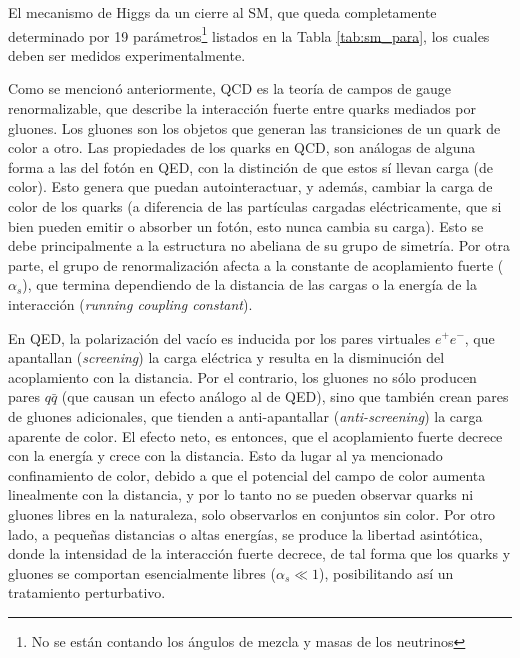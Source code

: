 El mecanismo de Higgs da un cierre al SM, que queda completamente determinado por 19 parámetros\footnote{No se están contando los ángulos de mezcla y masas de los neutrinos} listados en la Tabla \ref{tab:sm_para}, los cuales deben ser medidos experimentalmente.









Como se mencionó anteriormente, QCD \cite{qcd_collider, Tripiana:1433788} es la teoría de campos de gauge renormalizable,
que describe la interacción fuerte entre quarks mediados por gluones. Los gluones son los objetos que generan las transiciones de un quark de color a otro. Las propiedades de los quarks en QCD, son análogas de alguna forma a las del fotón en QED, con la distinción de que estos sí llevan carga (de color). Esto genera que puedan autointeractuar, y además, cambiar la carga de color de los quarks (a diferencia de las partículas cargadas eléctricamente, que si bien pueden emitir o absorber un fotón, esto nunca cambia su carga). Esto se debe principalmente a la estructura no abeliana de su grupo de simetría.
Por otra parte, el grupo de renormalización afecta a la constante de acoplamiento fuerte ($\alpha_s$), que termina dependiendo de la distancia de las cargas o la energía de la interacción (\textit{running coupling constant}). 

En QED, la polarización del vacío es inducida por los
pares virtuales $e^{+}e^{-}$, que apantallan (\textit{screening}) la carga eléctrica y resulta en la disminución del
acoplamiento con la distancia. Por el contrario, los gluones no sólo producen pares $q\bar{q}$ (que causan un efecto análogo al de QED), sino que también crean pares de gluones adicionales,
que tienden a anti-apantallar (\textit{anti-screening}) la carga aparente de color. El efecto neto, es entonces, que el acoplamiento fuerte decrece con la energía y crece con la distancia. Esto da lugar al ya mencionado confinamiento de color, debido a que el potencial del campo de color aumenta linealmente con la distancia, y por lo tanto no se pueden observar quarks ni gluones libres en la naturaleza, solo observarlos en conjuntos sin color. Por otro lado, a pequeñas distancias o altas energías, se produce la libertad asintótica, donde la intensidad de
la interacción fuerte decrece, de tal forma que los quarks y gluones se comportan
esencialmente libres ($\alpha_s \ll 1$), posibilitando así un tratamiento perturbativo. 

